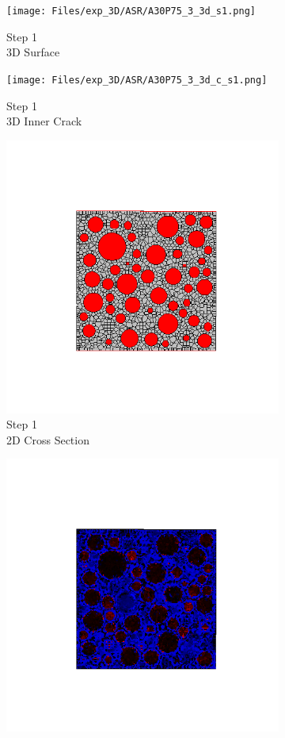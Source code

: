 \begin{figure}[ht!]
\centering
    \begin{subfigure}{.25\textwidth}
      \centering
      \texttt{[image: Files/exp\_3D/ASR/A30P75\_3\_3d\_s1.png]}
      \caption{Step 1\\3D Surface}
    \end{subfigure}%
    \begin{subfigure}{.25\textwidth}
      \centering
      \texttt{[image: Files/exp\_3D/ASR/A30P75\_3\_3d\_c\_s1.png]}
      \caption{Step 1\\3D Inner Crack}
    \end{subfigure}%
    \begin{subfigure}{.25\textwidth}
      \centering
      \includegraphics[width=.8\linewidth]{Files/exp_3D/ASR/A30P75_3_c1.png}
      \caption{Step 1\\2D Cross Section}
    \end{subfigure}%
    \begin{subfigure}{.25\textwidth}
      \centering
      \includegraphics[width=.8\linewidth]{Files/exp_3D/ASR/A30P75_3_s1.png}

\end{subfigure}
\end{figure}
